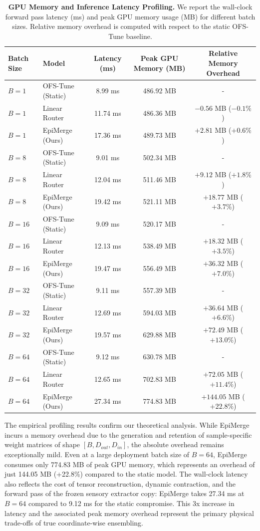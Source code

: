 \begin{table}[t]
\centering
\caption{\textbf{GPU Memory and Inference Latency Profiling.} We report the wall-clock forward pass latency (ms) and peak GPU memory usage (MB) for different batch sizes. Relative memory overhead is computed with respect to the static OFS-Tune baseline.}
\label{tab:profiling_results}
\vskip 0.15in
\begin{tabular}{llccc}
\toprule
\textbf{Batch Size} & \textbf{Model} & \textbf{Latency (ms)} & \textbf{Peak GPU Memory (MB)} & \textbf{Relative Memory Overhead} \\
\midrule
$B=1$ & OFS-Tune (Static) & 8.99 ms & 486.92 MB & - \\
$B=1$ & Linear Router & 11.74 ms & 486.36 MB & $-0.56$ MB ($-0.1\%$) \\
$B=1$ & EpiMerge (Ours) & 17.36 ms & 489.73 MB & $+2.81$ MB ($+0.6\%$) \\
\midrule
$B=8$ & OFS-Tune (Static) & 9.01 ms & 502.34 MB & - \\
$B=8$ & Linear Router & 12.04 ms & 511.46 MB & $+9.12$ MB ($+1.8\%$) \\
$B=8$ & EpiMerge (Ours) & 19.42 ms & 521.11 MB & $+18.77$ MB ($+3.7\%$) \\
\midrule
$B=16$ & OFS-Tune (Static) & 9.09 ms & 520.17 MB & - \\
$B=16$ & Linear Router & 12.13 ms & 538.49 MB & $+18.32$ MB ($+3.5\%$) \\
$B=16$ & EpiMerge (Ours) & 19.47 ms & 556.49 MB & $+36.32$ MB ($+7.0\%$) \\
\midrule
$B=32$ & OFS-Tune (Static) & 9.11 ms & 557.39 MB & - \\
$B=32$ & Linear Router & 12.69 ms & 594.03 MB & $+36.64$ MB ($+6.6\%$) \\
$B=32$ & EpiMerge (Ours) & 19.57 ms & 629.88 MB & $+72.49$ MB ($+13.0\%$) \\
\midrule
$B=64$ & OFS-Tune (Static) & 9.12 ms & 630.78 MB & - \\
$B=64$ & Linear Router & 12.65 ms & 702.83 MB & $+72.05$ MB ($+11.4\%$) \\
$B=64$ & EpiMerge (Ours) & 27.34 ms & 774.83 MB & $+144.05$ MB ($+22.8\%$) \\
\bottomrule
\end{tabular}
\end{table}

The empirical profiling results confirm our theoretical analysis. While EpiMerge incurs a memory overhead due to the generation and retention of sample-specific weight matrices of shape $[B, D_{out}, D_{in}]$, the absolute overhead remains exceptionally mild. Even at a large deployment batch size of $B=64$, EpiMerge consumes only 774.83 MB of peak GPU memory, which represents an overhead of just 144.05 MB (+22.8\%) compared to the static model. The wall-clock latency also reflects the cost of tensor reconstruction, dynamic contraction, and the forward pass of the frozen sensory extractor copy: EpiMerge takes 27.34 ms at $B=64$ compared to 9.12 ms for the static compromise. This 3x increase in latency and the associated peak memory overhead represent the primary physical trade-offs of true coordinate-wise ensembling.

